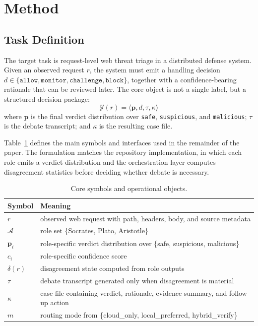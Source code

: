 \documentclass[pdflatex,sn-mathphys-num]{sn-jnl}
\begin{document}
\section{Method}\label{sec:method}

\subsection{Task Definition}

The target task is request-level web threat triage in a distributed defense system. Given an observed request $r$, the system must emit a handling decision $d \in \{\texttt{allow}, \texttt{monitor}, \texttt{challenge}, \texttt{block}\}$, together with a confidence-bearing rationale that can be reviewed later. The core object is not a single label, but a structured decision package:
\[
\mathcal{Y}(r) = \langle \mathbf{p}, d, \tau, \kappa \rangle
\]
where $\mathbf{p}$ is the final verdict distribution over \texttt{safe}, \texttt{suspicious}, and \texttt{malicious}; $\tau$ is the debate transcript; and $\kappa$ is the resulting case file.

Table~\ref{tab:symbols} defines the main symbols and interfaces used in the remainder of the paper. The formulation matches the repository implementation, in which each role emits a verdict distribution and the orchestration layer computes disagreement statistics before deciding whether debate is necessary.

\begin{table}[t]
  \centering
  \caption{Core symbols and operational objects.}
  \label{tab:symbols}
  \begin{tabular}{p{}p{}}
    \toprule
    Symbol & Meaning \\
    \midrule
    $r$ & observed web request with path, headers, body, and source metadata \\
    $\mathcal{A}$ & role set \{Socrates, Plato, Aristotle\} \\
    $\mathbf{p}_i$ & role-specific verdict distribution over \{safe, suspicious, malicious\} \\
    $c_i$ & role-specific confidence score \\
    $\delta(r)$ & disagreement state computed from role outputs \\
    $\tau$ & debate transcript generated only when disagreement is material \\
    $\kappa$ & case file containing verdict, rationale, evidence summary, and follow-up action \\
    $m$ & routing mode from \{cloud\_only, local\_preferred, hybrid\_verify\} \\
    \bottomrule
  \end{tabular}
\end{table}
\end{document}
